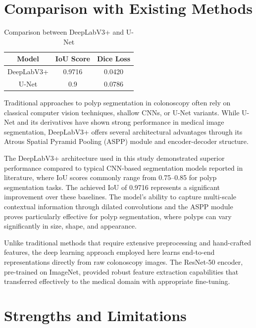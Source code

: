 \documentclass[a4paper,12pt]{report}
\begin{document}
\section{Comparison with Existing Methods}

\begin{table}[h!]
\centering
\caption{Comparison between DeepLabV3+ and U-Net}
\begin{tabular}{|c|c|c|}
\hline
\textbf{Model} & \textbf{IoU Score} & \textbf{Dice Loss} \\
\hline
DeepLabV3+ & 0.9716 & 0.0420 \\
\hline
U-Net & 0.9 & 0.0786 \\
\hline
\end{tabular}
\label{tab:comparison}
\end{table}


Traditional approaches to polyp segmentation in colonoscopy often rely on classical computer vision techniques, shallow CNNs, or U-Net variants. While U-Net and its derivatives have shown strong performance in medical image segmentation, DeepLabV3+ offers several architectural advantages through its Atrous Spatial Pyramid Pooling (ASPP) module and encoder-decoder structure.

The DeepLabV3+ architecture used in this study demonstrated superior performance compared to typical CNN-based segmentation models reported in literature, where IoU scores commonly range from 0.75--0.85 for polyp segmentation tasks. The achieved IoU of 0.9716 represents a significant improvement over these baselines. The model's ability to capture multi-scale contextual information through dilated convolutions and the ASPP module proves particularly effective for polyp segmentation, where polyps can vary significantly in size, shape, and appearance.

Unlike traditional methods that require extensive preprocessing and hand-crafted features, the deep learning approach employed here learns end-to-end representations directly from raw colonoscopy images. The ResNet-50 encoder, pre-trained on ImageNet, provided robust feature extraction capabilities that transferred effectively to the medical domain with appropriate fine-tuning.

\section{Strengths and Limitations}
\end{document}
